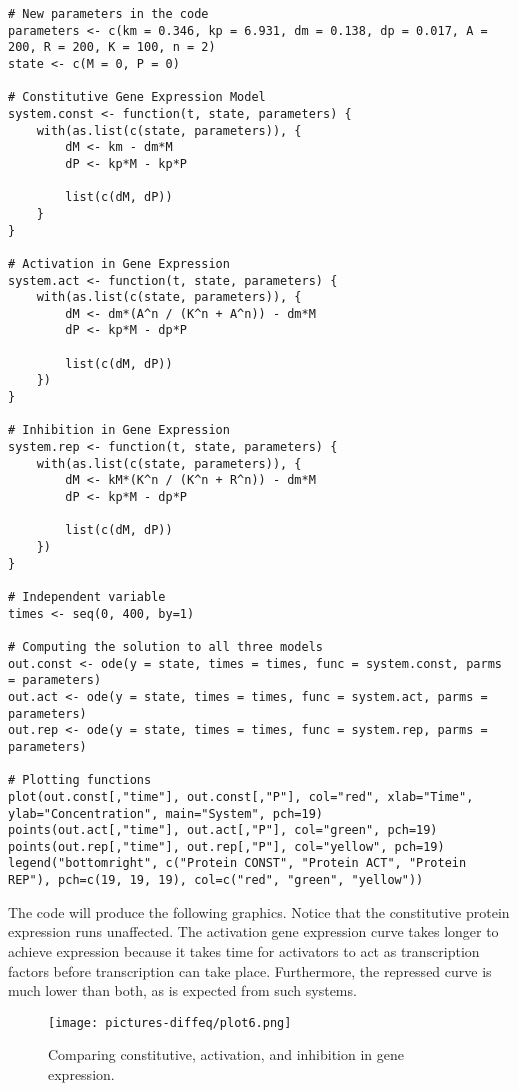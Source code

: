 \begin{lstlisting}
# New parameters in the code
parameters <- c(km = 0.346, kp = 6.931, dm = 0.138, dp = 0.017, A = 200, R = 200, K = 100, n = 2)
state <- c(M = 0, P = 0)

# Constitutive Gene Expression Model
system.const <- function(t, state, parameters) {
    with(as.list(c(state, parameters)), {
        dM <- km - dm*M
        dP <- kp*M - kp*P
        
        list(c(dM, dP))
    }
}

# Activation in Gene Expression
system.act <- function(t, state, parameters) {
    with(as.list(c(state, parameters)), {
        dM <- dm*(A^n / (K^n + A^n)) - dm*M
        dP <- kp*M - dp*P
        
        list(c(dM, dP))
    })
}

# Inhibition in Gene Expression
system.rep <- function(t, state, parameters) {
    with(as.list(c(state, parameters)), {
        dM <- kM*(K^n / (K^n + R^n)) - dm*M
        dP <- kp*M - dp*P
        
        list(c(dM, dP))
    })
}

# Independent variable
times <- seq(0, 400, by=1)

# Computing the solution to all three models
out.const <- ode(y = state, times = times, func = system.const, parms = parameters)
out.act <- ode(y = state, times = times, func = system.act, parms = parameters)
out.rep <- ode(y = state, times = times, func = system.rep, parms = parameters)

# Plotting functions
plot(out.const[,"time"], out.const[,"P"], col="red", xlab="Time", ylab="Concentration", main="System", pch=19)
points(out.act[,"time"], out.act[,"P"], col="green", pch=19)
points(out.rep[,"time"], out.rep[,"P"], col="yellow", pch=19)
legend("bottomright", c("Protein CONST", "Protein ACT", "Protein REP"), pch=c(19, 19, 19), col=c("red", "green", "yellow"))
\end{lstlisting}

The code will produce the following graphics. Notice that the constitutive protein expression runs unaffected. The activation gene expression curve takes longer to achieve expression because it takes time for activators to act as transcription factors before transcription can take place. Furthermore, the repressed curve is much lower than both, as is expected from such systems.

\begin{figure}[H]
    \centering
    \texttt{[image: pictures-diffeq/plot6.png]}
    \caption{Comparing constitutive, activation, and inhibition in gene expression.}
\end{figure}

